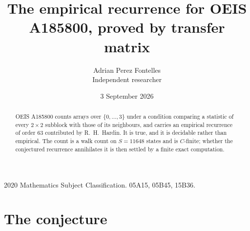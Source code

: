 \documentclass[11pt,a4paper]{article}
\title{The empirical recurrence for OEIS A185800, proved by transfer matrix}
\author{Adrian Perez Fontelles\\ \small Independent researcher}
\date{3 September 2026}
\theoremstyle{plain}
\theoremstyle{definition}
\begin{document}
\maketitle

\begin{abstract}
OEIS A185800 counts arrays over $\{0,\dots,3\}$ under a condition comparing a statistic of
every $2\times2$ subblock with those of its neighbours, and carries an empirical recurrence
of order $63$ contributed by R.~H.~Hardin. It is true, and it is decidable rather than
empirical. The count is a walk count on $S=11648$ states and is $C$-finite; whether the
conjectured recurrence annihilates it is then settled by a finite exact computation.
\end{abstract}

\noindent\small 2020 Mathematics Subject Classification. 05A15, 05B45, 15B36.\normalsize

\section{The conjecture}
\end{document}
